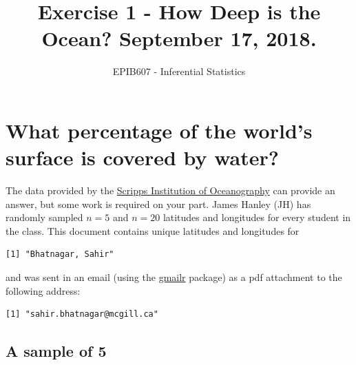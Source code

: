 \documentclass[letterpaper,9pt,twoside,printwatermark=false]{pinp}
\title{Exercise 1 - How Deep is the Ocean? September 17, 2018.}
\author[a]{EPIB607 - Inferential Statistics}
\affil[a]{Fall 2018, McGill University}
\begin{document}
\verticaladjustment{-2pt}

\maketitle
\thispagestyle{firststyle}



\section{What percentage of the world's surface is covered by
water?}\label{what-percentage-of-the-worlds-surface-is-covered-by-water}

The data provided by the
\href{https://topex.ucsd.edu/cgi-bin/get_srtm30.cgi}{Scripps Institution
of Oceanography} can provide an answer, but some work is required on
your part. James Hanley (JH) has randomly sampled \(n=5\) and \(n=20\)
latitudes and longitudes for every student in the class. This document
contains unique latitudes and longitudes for

\begin{ShadedResult}
\begin{verbatim}
[1] "Bhatnagar, Sahir"
\end{verbatim}
\end{ShadedResult}

and was sent in an email (using the
\href{https://cran.r-project.org/package=gmailr}{gmailr} package) as a
pdf attachment to the following address:

\begin{ShadedResult}
\begin{verbatim}
[1] "sahir.bhatnagar@mcgill.ca"
\end{verbatim}
\end{ShadedResult}

\subsection*{A sample of 5}\label{a-sample-of-5}
\end{document}
